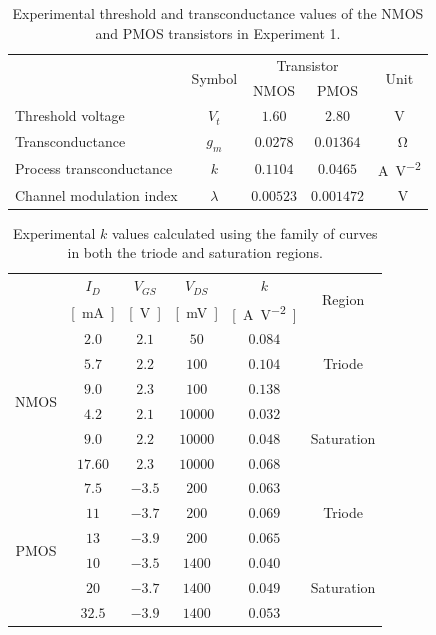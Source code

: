 \documentclass{report}
\begin{document}
\begin{table}[H]
	\centering
	\caption{Experimental threshold and transconductance values of the NMOS and PMOS transistors in Experiment 1.}
	\label{table:exp1values}
	\begin{threeparttable}
		\begin{tabular}{lcccc}
			\toprule
			\multirow{2}{*}{} & \multirow{2}{*}{Symbol} & \multicolumn{2}{c}{\footnotesize Transistor} & \multirow{2}{*}{Unit} \\
			& & NMOS & PMOS & \\
			\midrule
			Threshold voltage & $V_{t}$ & $1.60$ & $2.80$ & \si{\V}\\
			Transconductance & $g_m$ & $0.0278$ & $0.01364$ & \si{\per\ohm} \\
			Process transconductance & $k$ & $0.1104$ & $0.0465$ & \si{\A\per\V\squared} \\
			Channel modulation index & $\lambda$ & $0.00523$ & $0.001472$ & \si{\per\V} \\
			\bottomrule
		\end{tabular}
	\end{threeparttable}
\end{table}

\begin{table}[H]
	\centering
	\caption{Experimental $k$ values calculated using the family of curves in both the triode and saturation regions.}
	\label{table:exp1family}
	\begin{threeparttable}
		\begin{tabular}{cccccc}
			\toprule
			& $I_D$ & $V_{GS}$ & $V_{DS}$ & $k$ & \multirow{2}{*}{Region} \\
			& {\footnotesize \si{[\mA]}} & {\footnotesize \si{[\V]}}
				& {\footnotesize \si{[\mV]}}
				& {\footnotesize \si{[\A\per\V\squared]}}
				& \\
			\midrule
			\multirow{6}{*}{NMOS} & $2.0$ & $2.1$ & $50$ & $0.084$ & \multirow{3}{*}{Triode} \\
			& $5.7$ & $2.2$ & $100$ & $0.104$ & \\
			& $9.0$ & $2.3$ & $100$ & $0.138$ & \\
			\cline{2-6}
			& $4.2$ & $2.1$ & $10000$ & $0.032$ & \multirow{3}{*}{Saturation} \\
			& $9.0$ & $2.2$ & $10000$ & $0.048$ & \\
			& $17.60$ & $2.3$ & $10000$ & $0.068$ & \\
			\midrule
			\multirow{6}{*}{PMOS} & $7.5$ & $-3.5$ & $200$ & $0.063$ & \multirow{3}{*}{Triode} \\
& $11$ & $-3.7$ & $200$ & $0.069$ & \\
& $13$ & $-3.9$ & $200$ & $0.065$ & \\
			\cline{2-6}
& $10$ & $-3.5$ & $1400$ & $0.040$ & \multirow{3}{*}{Saturation} \\
& $20$ & $-3.7$ & $1400$ & $0.049$ & \\
& $32.5$ & $-3.9$ & $1400$ & $0.053$ & \\
			\bottomrule
		\end{tabular}
	\end{threeparttable}
\end{table}
\end{document}
